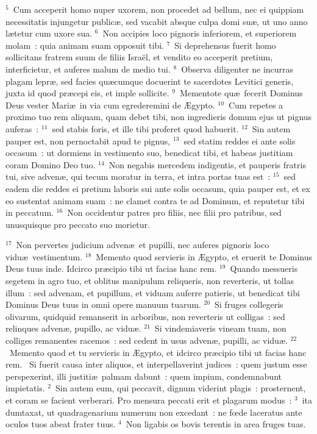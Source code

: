 ${}^{5}$~Cum acceperit homo nuper uxorem, non procedet ad bellum, nec ei quippiam necessitatis injungetur public\ae , sed vacabit absque culpa domi su\ae , ut uno anno l\ae tetur cum uxore sua.
${}^{6}$~Non accipies loco pignoris inferiorem, et superiorem molam~: quia animam suam opposuit tibi.
${}^{7}$~Si deprehensus fuerit homo sollicitans fratrem suum de filiis Isra\"el, et vendito eo acceperit pretium, interficietur, et auferes malum de medio tui.
${}^{8}$~Observa diligenter ne incurras plagam lepr\ae , sed facies qu\ae cumque docuerint te sacerdotes Levitici generis, juxta id quod pr\ae cepi eis, et imple sollicite.
${}^{9}$~Mementote qu\ae\ fecerit Dominus Deus vester Mari\ae\ in via cum egrederemini de \AE gypto.
${}^{10}$~Cum repetes a proximo tuo rem aliquam, quam debet tibi, non ingredieris domum ejus ut pignus auferas~:
${}^{11}$~sed stabis foris, et ille tibi proferet quod habuerit.
${}^{12}$~Sin autem pauper est, non pernoctabit apud te pignus,
${}^{13}$~sed statim reddes ei ante solis occasum~: ut dormiens in vestimento suo, benedicat tibi, et habeas justitiam coram Domino Deo tuo.
${}^{14}$~Non negabis mercedem indigentis, et pauperis fratris tui, sive adven\ae , qui tecum moratur in terra, et intra portas tuas est~:
${}^{15}$~sed eadem die reddes ei pretium laboris sui ante solis occasum, quia pauper est, et ex eo sustentat animam suam~: ne clamet contra te ad Dominum, et reputetur tibi in peccatum.
${}^{16}$~Non occidentur patres pro filiis, nec filii pro patribus, sed unusquisque pro peccato suo morietur.


${}^{17}$~Non pervertes judicium adven\ae\ et pupilli, nec auferes pignoris loco vidu\ae\ vestimentum.
${}^{18}$~Memento quod servieris in \AE gypto, et eruerit te Dominus Deus tuus inde. Idcirco pr\ae cipio tibi ut facias hanc rem.
${}^{19}$~Quando messueris segetem in agro tuo, et oblitus manipulum reliqueris, non reverteris, ut tollas illum~: sed advenam, et pupillum, et viduam auferre patieris, ut benedicat tibi Dominus Deus tuus in omni opere manuum tuarum.
${}^{20}$~Si fruges collegeris olivarum, quidquid remanserit in arboribus, non reverteris ut colligas~: sed relinques adven\ae , pupillo, ac vidu\ae .
${}^{21}$~Si vindemiaveris vineam tuam, non colliges remanentes racemos~: sed cedent in usus adven\ae , pupilli, ac vidu\ae .
${}^{22}$~Memento quod et tu servieris in \AE gypto, et idcirco pr\ae cipio tibi ut facias hanc rem.
~\lettrine[lines=10,image=true,loversize=0.05,lraise=-0.03]{S}{}i fuerit causa inter aliquos, et interpellaverint judices~: quem justum esse perspexerint, illi justiti\ae\ palmam dabunt~: quem impium, condemnabunt impietatis.
${}^{2}$~Sin autem eum, qui peccavit, dignum viderint plagis~: prosternent, et coram se facient verberari. Pro mensura peccati erit et plagarum modus~:
${}^{3}$~ita dumtaxat, ut quadragenarium numerum non excedant~: ne fœde laceratus ante oculos tuos abeat frater tuus.
${}^{4}$~Non ligabis os bovis terentis in area fruges tuas.


